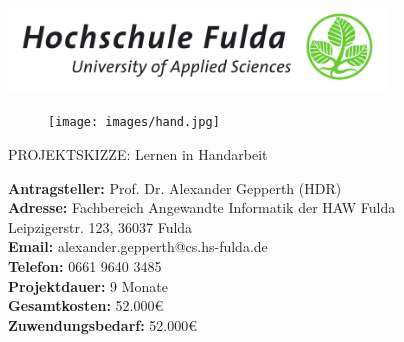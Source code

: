 \documentclass[11pt]{article}
\begin{document}
\begin{center}
{ \centering \includegraphics[width=10cm]{hsf.png} }

\vspace{-0.8cm}
\begin{figure}[h!]
\centering
\texttt{[image: images/hand.jpg]}
\end{figure}

{\Huge
PROJEKTSKIZZE: Lernen in Handarbeit
}
\\
\vspace{0.5cm}

\Large
{\bf Antragsteller:} Prof. Dr. Alexander Gepperth (HDR)\\
{\bf Adresse: } Fachbereich Angewandte Informatik der HAW Fulda\\
Leipzigerstr. 123, 36037 Fulda\\
{\bf Email: } alexander.gepperth@cs.hs-fulda.de\\
{\bf Telefon: } 0661 9640 3485\\
\vspace{0.5cm}
%
{\bf Projektdauer:} 9 Monate\\
%
{\bf Gesamtkosten:} 52.000\euro\\
%
{\bf Zuwendungsbedarf:} 52.000\euro\\
\vspace{0.5cm}

\end{center}
\newpage

\renewcommand{\thesection}{2}
\end{document}
